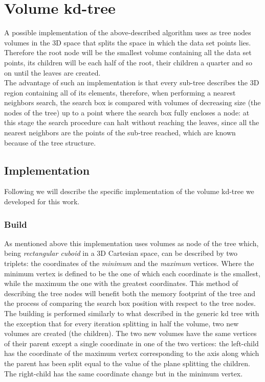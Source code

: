 \section{Volume kd-tree}
A possible implementation of the above-described algorithm uses as tree nodes volumes in the 3D space that splits the space in which the data set points lies. Therefore the root node will be the smallest volume containing all the data set points, its children will be each half of the root, their children a quarter and so on until the leaves are created.\\
The advantage of such an implementation is that every sub-tree describes the 3D region containing all of its elements, therefore, when performing a nearest neighbors search, the search box is compared with volumes of decreasing size (the nodes of the tree) up to a point where the search box fully encloses a node: at this stage the search procedure can halt without reaching the leaves, since all the nearest neighbors are the points of the sub-tree reached, which are known because of the tree structure.\\

\subsection{Implementation}
Following we will describe the specific implementation of the volume kd-tree we developed for this work.
\subsubsection{Build}
As mentioned above this implementation uses volumes as node of the tree which, being \textit{rectangular cuboid} in a 3D Cartesian space, can be described by two triplets: the coordinates of the \textit{minimum} and the \textit{maximum} vertices. Where the minimum vertex is defined to be the one of which each coordinate is the smallest, while the maximum the one with the greatest coordinates. This method of describing the tree nodes will benefit both the memory footprint of the tree and the process of comparing the search box position with respect to the tree nodes.\\
The building is performed similarly to what described in the generic kd tree with the exception that for every iteration splitting in half the volume, two new volumes are created (the children). The two new volumes have the same vertices of their parent except a single coordinate in one of the two vertices: the left-child has the coordinate of the maximum vertex corresponding to the axis along which the parent has been split equal to the value of the plane splitting the children. The right-child has the same coordinate change but in the minimum vertex.\\
